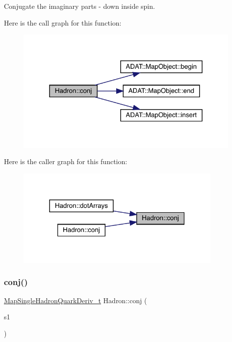 Conjugate the imaginary parts -\/ down inside spin. 

Here is the call graph for this function\+:\nopagebreak
\begin{figure}[H]
\begin{center}
\leavevmode
\includegraphics[width=313pt]{d1/daf/namespaceHadron_a5b62c8e194d4e04483d980199eff43fa_cgraph}
\end{center}
\end{figure}
Here is the caller graph for this function\+:\nopagebreak
\begin{figure}[H]
\begin{center}
\leavevmode
\includegraphics[width=286pt]{d1/daf/namespaceHadron_a5b62c8e194d4e04483d980199eff43fa_icgraph}
\end{center}
\end{figure}
\mbox{\label{namespaceHadron_a218b77b239d871def6267d4b34bdf7c1}} 
\subsubsection{\texorpdfstring{conj()}{conj()}\hspace{0.1cm}{\footnotesize\ttfamily [2/3]}}
{\footnotesize\ttfamily \mbox{\hyperlink{namespaceHadron_aa588220689caea8a6aad4d0296526e6b}{Map\+Single\+Hadron\+Quark\+Deriv\+\_\+t}} Hadron\+::conj (\begin{DoxyParamCaption}\item[{const \mbox{\hyperlink{namespaceHadron_aa588220689caea8a6aad4d0296526e6b}{Map\+Single\+Hadron\+Quark\+Deriv\+\_\+t}} \&}]{s1 }\end{DoxyParamCaption})}



